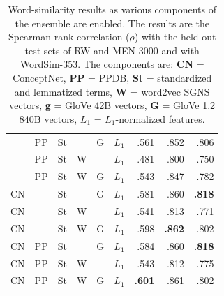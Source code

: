 \documentclass[11pt,letterpaper]{article}
\begin{document}
\begin{table}[t]
\begin{tabular}{llllll|rrr}
\midrule
     & PP   & St   &      & G    & $L_1$  &    .561 &    .852 &    .806 \\  %
     & PP   & St   & W    &      & $L_1$  &    .481 &    .800 &    .750 \\  %
     & PP   & St   & W    & G    & $L_1$  &    .543 &    .847 &    .782 \\  %
CN   &      & St   &      & G    & $L_1$  &    .581 &    .860 &\bf .818 \\  %
CN   &      & St   & W    &      & $L_1$  &    .541 &    .813 &    .771 \\  %
CN   &      & St   & W    & G    & $L_1$  &    .598 &\bf .862 &    .802 \\  %
CN   & PP   & St   &      & G    & $L_1$  &    .584 &    .860 &\bf .818 \\  %
CN   & PP   & St   & W    &      & $L_1$  &    .543 &    .812 &    .775 \\  %
CN   & PP   & St   & W    & G    & $L_1$  &\bf .601 &    .861 &    .802 \\  %
\bottomrule
\end{tabular}

\caption{
    Word-similarity results as various components of the ensemble are enabled.
    The results are the Spearman rank correlation ($\rho$) with the held-out
    test sets of RW and MEN-3000 and with WordSim-353.
    The components are: {\bf CN} = ConceptNet,
    {\bf PP} = PPDB, {\bf St} = standardized and lemmatized terms,
    {\bf W} = word2vec SGNS vectors, {\bf g} = GloVe 42B vectors,
    {\bf G} = GloVe 1.2 840B vectors, {\bf $L_1$} = $L_1$-normalized features.
}
\label{eval-bigtable}
\end{table}
\end{document}
